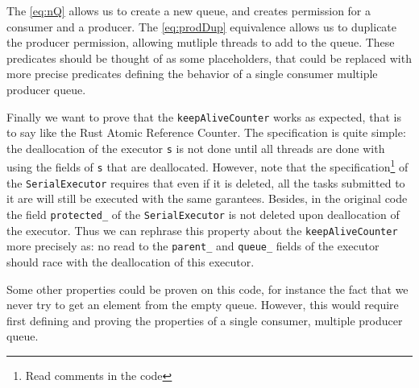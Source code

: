 The \eqref{eq:nQ} allows us to create a new queue, and creates permission for a consumer and a producer. The \eqref{eq:prodDup} equivalence allows us to duplicate the producer permission, allowing mutliple threads to add to the queue. These predicates should be thought of as some placeholders, that could be replaced with more precise predicates defining the behavior of a single consumer multiple producer queue.

Finally we want to prove that the \texttt{keepAliveCounter} works as expected, that is to say like the Rust Atomic Reference Counter. The specification is quite simple: the deallocation of the executor \texttt{s} is not done until all threads are done with using the fields of \texttt{s} that are deallocated. However, note that the specification\footnote{Read comments in the code} of the \texttt{SerialExecutor} requires that even if it is deleted, all the tasks submitted to it are will still be executed with the same garantees. Besides, in the original code the field \texttt{protected\_} of the \texttt{SerialExecutor} is not deleted upon deallocation of the executor. Thus we can rephrase this property about the \texttt{keepAliveCounter} more precisely as: no read to the \texttt{parent\_} and \texttt{queue\_} fields of the executor should race with the deallocation of this executor.

Some other properties could be proven on this code, for instance the fact that we never try to get an element from the empty queue. However, this would require first defining and proving the properties of a single consumer, multiple producer queue.

